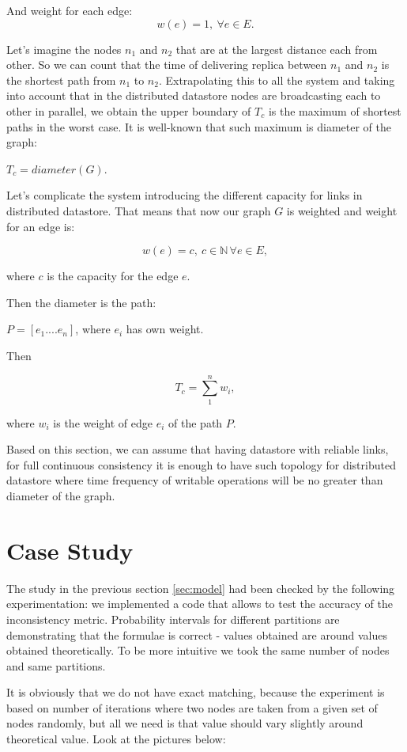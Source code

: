 \documentclass{llncs}
\begin{document}
And weight for each edge:
\[w(e) = 1  ,\ \forall e \in E .\]


Let's imagine the nodes $n_1$ and  $n_2$ that are at the largest distance each from other. So we can count that the time of delivering replica between $n_1$ and $n_2$ is the shortest path from $n_1$ to $n_2$. Extrapolating this to all the system and taking into account that in the distributed datastore nodes are broadcasting each to other in parallel,  we obtain the upper boundary of $T_c$ is the maximum of shortest paths in the worst case. It is well-known that such maximum is diameter of the graph:


$T_c = diameter(G)$.


Let's complicate the system introducing the different capacity for links in distributed datastore.
That means that now our graph $G$ is weighted and weight for an edge is:

\[w(e) = c  ,\ c\in\mathbb{N} \,  \forall e \in E , \]

where $c$ is the capacity for the edge $e$.

Then the diameter is the path:


$P = [e_1....e_n]$, where $e_i$ has own weight.


Then

\[T_c = \sum_1^{n}w_i ,\]

where $w_i$ is the weight of edge $e_i$ of the path $P$.


Based on this section, we can assume that having datastore with reliable links, for full continuous consistency it is enough to have such topology for distributed datastore where time frequency of writable operations will be no greater than diameter of the graph.

\section{Case Study}\label{sec:experiments}

The study in the previous section \ref{sec:model} had been checked by the following experimentation: 
we implemented a code that allows to test the accuracy of the inconsistency metric. Probability intervals for different partitions are demonstrating that the formulae is correct - values obtained are around values obtained theoretically. To be more intuitive we took the same number of nodes and same partitions.

It is obviously that we do not have exact matching, because the experiment is based on number of iterations where two nodes are taken from a given set of nodes randomly, but all we need is that value should vary slightly around theoretical value. Look at the pictures below:
\end{document}
